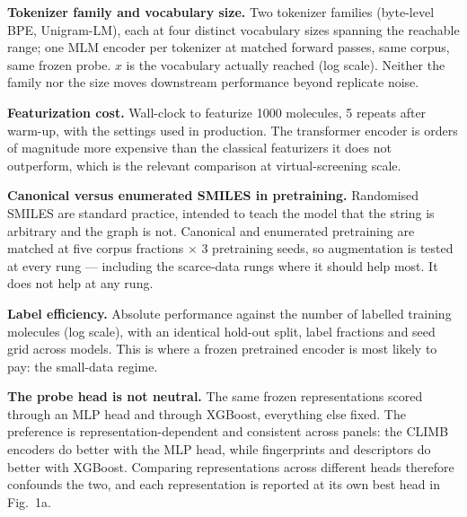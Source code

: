\caption{\textbf{Tokenizer family and vocabulary size.}
Two tokenizer families (byte-level BPE, Unigram-LM), each at four distinct vocabulary sizes
spanning the reachable range; one MLM encoder per tokenizer at matched forward passes, same
corpus, same frozen probe. $x$ is the vocabulary actually reached (log scale).
Neither the family nor the size moves downstream performance beyond replicate noise.}

\caption{\textbf{Featurization cost.}
Wall-clock to featurize 1000 molecules, 5 repeats after warm-up, with the settings used in
production. The transformer encoder is orders of magnitude more expensive than the classical
featurizers it does not outperform, which is the relevant comparison at virtual-screening
scale.}

\caption{\textbf{Canonical versus enumerated SMILES in pretraining.}
Randomised SMILES are standard practice, intended to teach the model that the string is
arbitrary and the graph is not. Canonical and enumerated pretraining are matched at five corpus
fractions $\times$ 3 pretraining seeds, so augmentation is tested at every rung --- including
the scarce-data rungs where it should help most.
It does not help at any rung.}

\caption{\textbf{Label efficiency.}
Absolute performance against the number of labelled training molecules (log scale), with an
identical hold-out split, label fractions and seed grid across models. This is where a frozen
pretrained encoder is most likely to pay: the small-data regime.}

\caption{\textbf{The probe head is not neutral.}
The same frozen representations scored through an MLP head and through XGBoost, everything else
fixed. The preference is representation-dependent and consistent across panels: the CLIMB
encoders do better with the MLP head, while fingerprints and descriptors do better
with XGBoost. Comparing representations across different heads therefore confounds the two, and
each representation is reported at its own best head in Fig.~1a.}
